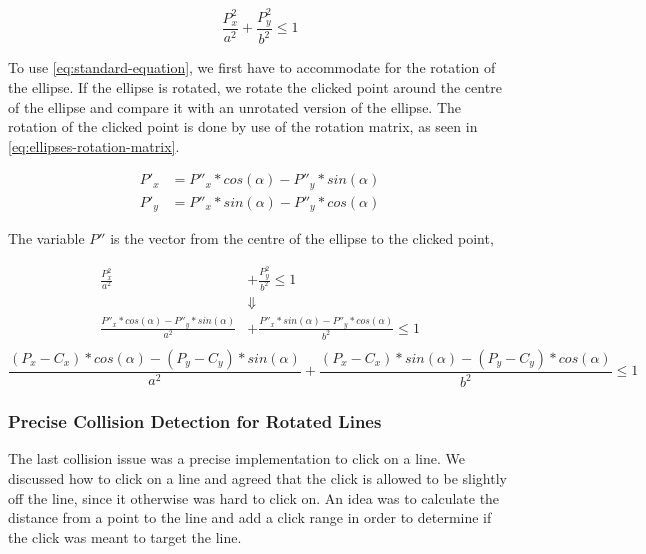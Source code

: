 \begin{equation}\label{eq:standard-equation}
	\frac{P_x^2}{a^2} + \frac{P_y^2}{b^2} \leq 1
\end{equation}

To use \eqref{eq:standard-equation}, we first have to accommodate for the rotation of the ellipse.
If the ellipse is rotated, we rotate the clicked point around the centre of the ellipse and compare it with an unrotated version of the ellipse.
The rotation of the clicked point is done by use of the rotation matrix, as seen in \eqref{eq:ellipses-rotation-matrix}.

\begin{equation}\label{eq:ellipses-rotation-matrix}
\begin{aligned}
	P'_x &= P''_x * cos(\alpha) - P''_y * sin(\alpha)\\
	P'_y &= P''_x * sin(\alpha) - P''_y * cos(\alpha)
\end{aligned}
\end{equation}

The variable $P''$ is the vector from the centre of the ellipse to the clicked point, 


\begin{equation}\label{eq:final-ellipses-equation}
\begin{aligned}
	\frac{P_x^2}{a^2} &+ \frac{P_y^2}{b^2} \leq 1	\\
	&\Downarrow\\
	\frac{ P''_x * cos(\alpha) - P''_y * sin(\alpha)}{a^2} &+ \frac{P''_x * sin(\alpha) - P''_y * cos(\alpha)}{b^2} \leq 1\\
\end{aligned}
\end{equation}
\begin{equation}		
	\frac{ (P_x - C_x) * cos(\alpha) - (P_y - C_y) * sin(\alpha)}{a^2} + \frac{(P_x - C_x) * sin(\alpha) - (P_y - C_y) * cos(\alpha)}{b^2} \leq 1
\end{equation}


\subsubsection{Precise Collision Detection for Rotated Lines}
The last collision issue was a precise implementation to click on a line.
We discussed how to click on a line and agreed that the click is allowed to be slightly off the line, since it otherwise was hard to click on.
An idea was to calculate the distance from a point to the line and add a click range in order to determine if the click was meant to target the line.

